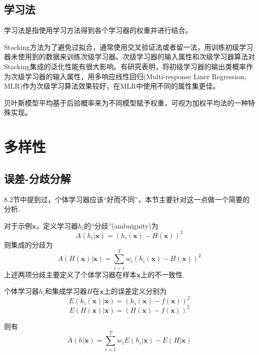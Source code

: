 \subsection{学习法}

学习法是指使用学习方法得到各个学习器的权重并进行结合。

Stacking方法为了避免过拟合，通常使用交叉验证法或者留一法，用训练初级学习器未使用到的数据来训练次级学习器。次级学习器的输入属性和次级学习器算法对Stacking集成的泛化性能有很大影响。有研究表明，将初级学习器的输出类概率作为次级学习器的输入属性，用多响应线性回归(Multi-response Liner Regression, MLR)作为次级学习算法效果较好，在MLR中使用不同的属性集更佳。

贝叶斯模型平均基于后验概率来为不同模型赋予权重，可视为加权平均法的一种特殊实现。

\section{多样性}

\subsection{误差-分歧分解}

8.2节中提到过，个体学习器应该“好而不同”，本节主要针对这一点做一个简要的分析.

对于示例$\mathbf{x}$，定义学习器$h_i$的“分歧”(ambuiguity)为
\begin{equation}
A(h_i|\mathbf{x})=(h_i(\mathbf{x})-H(\mathbf{x}))^2
\end{equation}
则集成的分歧为
\begin{equation}
A(H(\mathbf{x})|\mathbf{x})=\sum_{i=1}^Tw_i(h_i(\mathbf{x})-H(\mathbf{x}))^2
\end{equation}
上述两项分歧主要定义了个体学习器在样本$\mathbf{x}$上的不一致性.

个体学习器$h_i$和集成学习器$H$在$\mathbf{x}$上的误差定义分别为
\begin{equation}
E(h_i(\mathbf{x})|\mathbf{x})=(h_i(\mathbf{x})-f(\mathbf{x}))^2
\end{equation}
\begin{equation}
E(H(\mathbf{x})|\mathbf{x})=(H(\mathbf{x})-f(\mathbf{x}))^2
\end{equation}

则有
\begin{equation}
\bar{A}(h|\mathbf{x})=\sum_{i=1}^Tw_iE(h_i|\mathbf{x})-E(H|\mathbf{x})
\end{equation}

